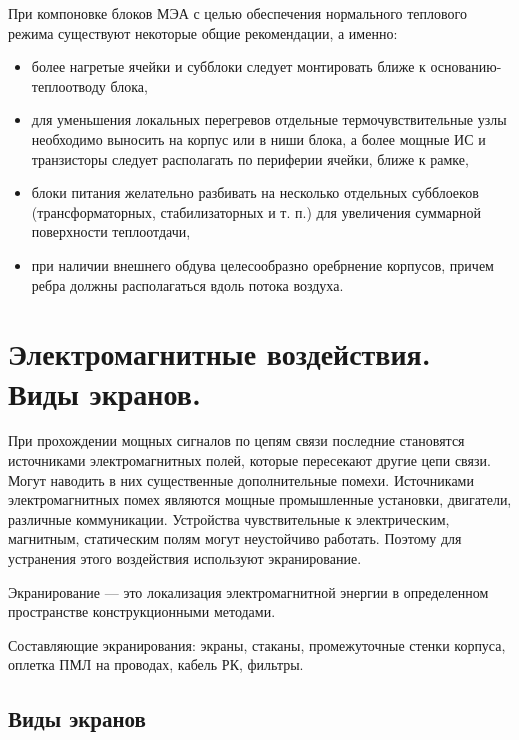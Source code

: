 \documentclass[unicode, 12pt, a4paper, oneside]{article}
\begin{document}
При компоновке блоков МЭА с целью обеспечения нормального теплового режима существуют некоторые общие рекомендации, а именно:
\begin{itemize}
\item более нагретые ячейки и субблоки следует монтировать ближе к основанию-теплоотводу блока,
\item для уменьшения локальных перегревов отдельные термочувствительные узлы необходимо выносить на корпус или в ниши блока, а более мощные ИС и транзисторы следует располагать по периферии ячейки, ближе к рамке, 
\item блоки питания желательно разбивать на несколько отдельных субблоеков (трансформаторных, стабилизаторных и т. п.) для увеличения суммарной поверхности теплоотдачи,
\item при наличии внешнего обдува целесообразно оребрнение корпусов, причем ребра должны располагаться вдоль потока воздуха.
\end{itemize}


\section{Электромагнитные воздействия. Виды экранов.}

При прохождении мощных сигналов по цепям связи последние становятся источниками электромагнитных полей, которые пересекают другие цепи связи. Могут наводить в них существенные дополнительные помехи. Источниками электромагнитных помех являются мощные промышленные установки, двигатели, различные коммуникации. Устройства чувствительные к электрическим, магнитным, статическим полям могут неустойчиво работать. Поэтому для устранения этого воздействия используют экранирование.

Экранирование --- это локализация электромагнитной энергии в определенном пространстве конструкционными методами.

Составляющие экранирования: экраны, стаканы, промежуточные стенки корпуса, оплетка ПМЛ на проводах, кабель РК, фильтры.

\subsection*{Виды экранов}
\end{document}
